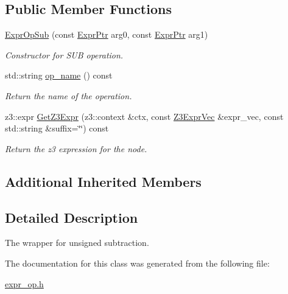 \subsection*{Public Member Functions}
\begin{DoxyCompactItemize}
\item 
\mbox{\label{classilang_1_1_expr_op_sub_a267e9f8c51a8e703d87b69607fcb88bf}} 
\mbox{\hyperlink{classilang_1_1_expr_op_sub_a267e9f8c51a8e703d87b69607fcb88bf}{Expr\+Op\+Sub}} (const \mbox{\hyperlink{classilang_1_1_expr_a85952b6a34620c4c8cab6bac9c9fdf8c}{Expr\+Ptr}} arg0, const \mbox{\hyperlink{classilang_1_1_expr_a85952b6a34620c4c8cab6bac9c9fdf8c}{Expr\+Ptr}} arg1)
\begin{DoxyCompactList}\small\item\em Constructor for S\+UB operation. \end{DoxyCompactList}\item 
\mbox{\label{classilang_1_1_expr_op_sub_a7e776b3b60be1ba2f598449df4acb56f}} 
std\+::string \mbox{\hyperlink{classilang_1_1_expr_op_sub_a7e776b3b60be1ba2f598449df4acb56f}{op\+\_\+name}} () const
\begin{DoxyCompactList}\small\item\em Return the name of the operation. \end{DoxyCompactList}\item 
\mbox{\label{classilang_1_1_expr_op_sub_af28e786a96572faadd310322ebb89691}} 
z3\+::expr \mbox{\hyperlink{classilang_1_1_expr_op_sub_af28e786a96572faadd310322ebb89691}{Get\+Z3\+Expr}} (z3\+::context \&ctx, const \mbox{\hyperlink{namespaceilang_adc4eee919aa24fff882d03a48d733c19}{Z3\+Expr\+Vec}} \&expr\+\_\+vec, const std\+::string \&suffix=\char`\"{}\char`\"{}) const
\begin{DoxyCompactList}\small\item\em Return the z3 expression for the node. \end{DoxyCompactList}\end{DoxyCompactItemize}
\subsection*{Additional Inherited Members}


\subsection{Detailed Description}
The wrapper for unsigned subtraction. 

The documentation for this class was generated from the following file\+:\begin{DoxyCompactItemize}
\item 
\mbox{\hyperlink{expr__op_8h}{expr\+\_\+op.\+h}}\end{DoxyCompactItemize}
